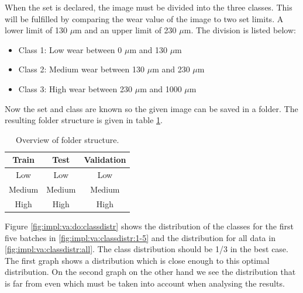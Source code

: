 			When the set is declared, the image must be divided into the three classes. This will be fulfilled by comparing the wear value of the image to two set limits. A lower limit of 130 $\mu$m and an upper limit of 230 $\mu$m. The division is listed below:
			\begin{itemize}
				\item Class 1: Low wear between 0 $\mu$m and 130 $\mu$m
				\item Class 2: Medium wear between 130 $\mu$m and 230 $\mu$m
				\item Class 3: High wear between 230 $\mu$m and 1000 $\mu$m
			\end{itemize}		
			
			Now the set and class are known so the given image can be saved in a folder. The resulting folder structure is given in table \ref{tab:impl:visionalgorithms:folderstructure}.
			\begin{table}
			\centering
			\caption{Overview of folder structure.}
			\centering
			\begin{tabular}{c c c}
				Train 	& Test 	& Validation\\ \hline
				Low	& Low & Low \\ 
				Medium & Medium & Medium \\
				High	& High	& High\\
			\end{tabular}
			\label{tab:impl:visionalgorithms:folderstructure}
			\end{table}
			
		 Figure \ref{fig:impl:va:do:classdistr} shows the distribution of the classes for the first five batches in \ref{fig:impl:va:classdistr:1-5} and the distribution for all data in \ref{fig:impl:va:classdistr:all}. The class distribution should be 1/3 in the best case. The first graph shows a distribution which is close enough to this optimal distribution. On the second graph on the other hand we see the distribution that is far from even which must be taken into account when analysing the results.

